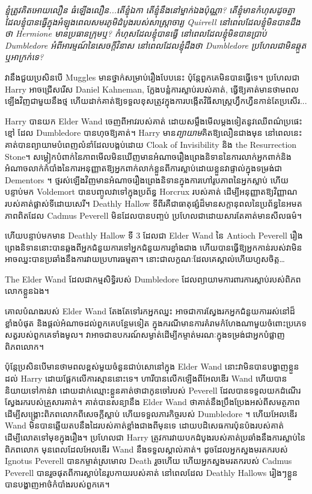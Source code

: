 \emph{ខ្ញុំត្រូវគិតអោយលឿន ធំឡើងលឿន...តើខ្ញុំឯកា តើខ្ញុំនឹងនៅម្នាក់ឯងប៉ុណ្ណា? តើ​ខ្ញុំ​មាន​កំហុស​ដូច​គ្នា​ដែល​ខ្ញុំ​បាន​ធ្វើ​ក្នុង​អំឡុង​ពេល​សមរភូមិ​ដំបូង​របស់​សាស្ត្រាចារ្យ Quirrell នៅ​ពេល​ដែល​ខ្ញុំ​មិន​បាន​ដឹង​ថា Hermione មាន​ប្រធាន​ក្រុម​ឬ? កំហុសដែលខ្ញុំបានធ្វើ នៅពេលដែលខ្ញុំមិនបានប្រាប់ Dumbledore អំពីអារម្មណ៍នៃសេចក្តីវិនាស នៅពេលដែលខ្ញុំដឹងថា Dumbledore ប្រហែលជាមិនឆ្កួត ឬអាក្រក់ទេ?}

វានឹងជួយប្រសិនបើ Muggles មានថ្នាក់សម្រាប់រឿងបែបនេះ ប៉ុន្តែពួកគេមិនបានធ្វើទេ។ ប្រហែលជា Harry អាចជ្រើសរើស Daniel Kahneman, ក្លែងបន្លំការស្លាប់របស់គាត់, ធ្វើឱ្យគាត់មានថាមពលឡើងវិញជាមួយនឹងថ្ម ហើយដាក់គាត់ឱ្យទទួលខុសត្រូវក្នុងការបង្កើតវិធីសាស្រ្តហ្វឹកហ្វឺនកាន់តែប្រសើរ...

Harry បានយក Elder Wand ចេញពីអាវរបស់គាត់ ដោយសម្លឹងមើលម្តងទៀតនូវឈើពណ៌ប្រផេះខ្មៅ ដែល Dumbledore បានហុចឱ្យគាត់។ Harry មាន\emph{ព្យាយាម}គិតឱ្យលឿនជាងមុន នៅពេលនេះគាត់បានព្យាយាមបំពេញលំនាំដែលបង្កប់ដោយ Cloak of Invisibility និង the Resurrection Stone។ សម្លៀកបំពាក់នៃភាពមើលមិនឃើញមានអំណាចរឿងព្រេងនិទាននៃការលាក់អ្នកពាក់និងអំណាចលាក់កំបាំងនៃការអនុញ្ញាតឱ្យអ្នកពាក់លាក់ខ្លួនពីការស្លាប់ដោយខ្លួនវាផ្ទាល់ក្នុងទម្រង់ជា Dementors ។ ថ្មរស់ឡើងវិញមានអំណាចរឿងព្រេងនិទានក្នុងការហៅរូបភាពនៃអ្នកស្លាប់ ហើយបន្ទាប់មក Voldemort បានបញ្ចូលវាទៅក្នុងប្រព័ន្ធ Horcrux របស់គាត់ ដើម្បីអនុញ្ញាតឱ្យវិញ្ញាណរបស់គាត់ផ្លាស់ទីដោយសេរី។ Deathly Hallow ទីពីរគឺជាធាតុផ្សំដ៏មានសក្តានុពលនៃប្រព័ន្ធនៃអមតភាពពិតដែល Cadmus Peverell មិនដែលបានបញ្ចប់ ប្រហែលជាដោយសារតែគាត់មានសីលធម៌។

ហើយបន្ទាប់មកមាន Deathly Hallow ទី 3 ដែលជា Elder Wand នៃ Antioch Peverell រឿងព្រេងនិទាននោះបានឆ្លងពីអ្នកជំនួយការទៅអ្នកជំនួយការខ្លាំងជាង ហើយបានធ្វើឱ្យអ្នកកាន់របស់វាមិនអាចឈ្នះបានប្រឆាំងនឹងការវាយប្រហារធម្មតា។ នោះ​ជា​លក្ខណៈ​ដែល​គេ​ស្គាល់​ហើយ​ហួស​ចិត្ត…

The Elder Wand ដែលជាកម្មសិទ្ធិរបស់ Dumbledore ដែលព្យាយាមការពារការស្លាប់របស់ពិភពលោកខ្លួនឯង។

គោលបំណងរបស់ Elder Wand តែងតែទៅរកអ្នកឈ្នះ អាចជាការស្វែងរកអ្នកជំនួយការរស់នៅដ៏ខ្លាំងបំផុត និងផ្តល់អំណាចដល់ពួកគេបន្ថែមទៀត ក្នុងករណីមានការគំរាមកំហែងណាមួយចំពោះប្រភេទសត្វរបស់ពួកគេទាំងមូល។ វា​អាច​ជា​ឧបករណ៍​សម្ងាត់​ដើម្បី​កម្ចាត់​មរណៈ​ក្នុង​ទម្រង់​ជា​អ្នក​បំផ្លាញ​ពិភពលោក។

ប៉ុន្តែ​ប្រសិនបើ​មាន​ថាមពល​ខ្ពស់​មួយ​ចំនួន​ជាប់​សោ​នៅក្នុង Elder Wand នោះ​វា​មិន​បាន​បង្ហាញ​ខ្លួន​ដល់ Harry ដោយ​ផ្អែក​លើ​ការ​ស្មាន​នោះ​ទេ។ ហារីបានលើកឡើងពីអែលឌើរ Wand ហើយបាននិយាយទៅកាន់វា ដោយដាក់ឈ្មោះខ្លួនគាត់ថាជាកូនចៅរបស់ Peverell ដែលបានទទួលយកដំណើរស្វែងរករបស់គ្រួសារគាត់។ គាត់​បាន​សន្យា​នឹង Elder Wand ថា​គាត់​នឹង​ប្រឹងប្រែង​អស់ពី​សមត្ថភាព​ដើម្បី​សង្គ្រោះ​ពិភពលោក​ពី​សេចក្ដីស្លាប់ ហើយ​ទទួល​ភារកិច្ច​របស់ Dumbledore ។ ហើយអែលឌើរ Wand មិនបានឆ្លើយតបនឹងដៃរបស់គាត់ខ្លាំងជាងពីមុនទេ ដោយបដិសេធការប៉ុនប៉ងរបស់គាត់ដើម្បីលោតទៅមុខក្នុងរឿង។ ប្រហែលជា Harry ត្រូវការវាយបកដំបូងរបស់គាត់ប្រឆាំងនឹងការស្លាប់នៃពិភពលោក មុនពេលដែលអែលឌើរ Wand នឹងទទួលស្គាល់គាត់។ ដូចដែលអ្នកស្នងមរតករបស់ Ignotus Peverell បានកម្ចាត់ស្រមោល Death រួចហើយ ហើយអ្នកស្នងមរតករបស់ Cadmus Peverell បានរួចផុតពីការស្លាប់នៃរូបកាយរបស់គាត់ នៅពេលដែល Deathly Hallows រៀងៗខ្លួនបានបង្ហាញអាថ៌កំបាំងរបស់ពួកគេ។

